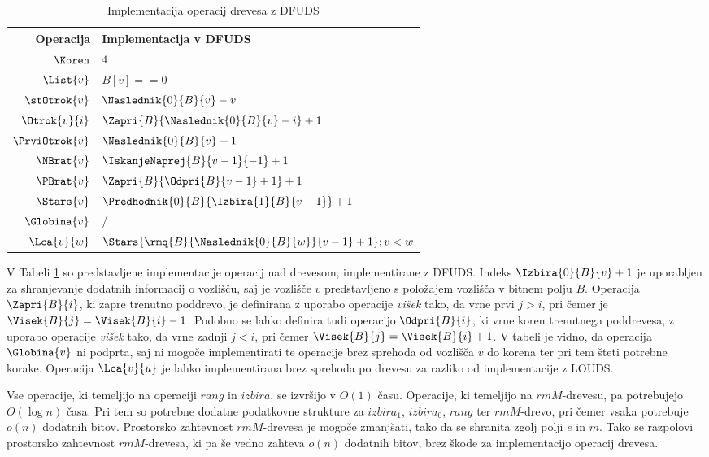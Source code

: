 \begin{table}[htb]
    \centering
    \caption{Implementacija operacij drevesa z DFUDS}
    \begin{tabular}{r|l}
\textbf{Operacija}& \textbf{Implementacija v DFUDS} \\\hline
         $\Koren$ &          $4$\\
         $\List{v}$ &        $B[v]==0$\\
         $\stOtrok{v}$&      $\Naslednik{0}{B}{v}-v$\\
         $\Otrok{v}{i}$ &    $\Zapri{B}{\Naslednik{0}{B}{v} - i}+1$\\
         $\PrviOtrok{v}$&     $\Naslednik{0}{B}{v}+1$\\
         $\NBrat{v}$ &       $\IskanjeNaprej{B}{v-1}{-1}+1$ \\
         $\PBrat{v}$ &       $\Zapri{B}{\Odpri{B}{v-1}+1}+1$ \\
         $\Stars{v}$ &        $\Predhodnik{0}{B}{\Izbira{1}{B}{v-1}}+1$ \\
         $\Globina{v}$ &         / \\
         $\Lca{v}{w}$ &      $\Stars{\rmq{B}{\Naslednik{0}{B}{w}}{v-1}+1};v<w$\\

    \end{tabular}
    \label{tab:DFUDSop}
\end{table}

V Tabeli \ref{tab:DFUDSop} so predstavljene implementacije operacij nad drevesom, implementirane z DFUDS. Indeks $\Izbira{0}{B}{v}+1$ je uporabljen za shranjevanje dodatnih informacij o vozlišču, saj je vozlišče $v$ predstavljeno s položajem vozlišča v bitnem polju $B$. Operacija $\Zapri{B}{i}$, ki zapre trenutno poddrevo, je definirana z uporabo operacije \textit{višek} tako, da vrne prvi $j>i$, pri čemer je $\Visek{B}{j}=\Visek{B}{i}-1$. Podobno se lahko definira tudi operacijo $\Odpri{B}{i}$, ki vrne koren trenutnega poddrevesa, z uporabo operacije \textit{višek} tako, da vrne zadnji $j<i$, pri čemer $\Visek{B}{j}=\Visek{B}{i}+1$. V tabeli je vidno, da operacija $\Globina{v}$ ni podprta, saj ni mogoče implementirati te operacije brez sprehoda od vozlišča $v$ do korena ter pri tem šteti potrebne korake. Operacija $\Lca{v}{u}$ je lahko implementirana brez sprehoda po drevesu za razliko od implementacije z LOUDS.

Vse operacije, ki temeljijo na operaciji $rang$ in $izbira$, se izvršijo v $O(1)$ času. Operacije, ki temeljijo na $rmM$-drevesu, pa potrebujejo $O(\log{n})$ časa. Pri tem so potrebne dodatne podatkovne strukture za $izbira_1$, $izbira_0$, $rang$ ter $rmM$-drevo, pri čemer vsaka potrebuje $o(n)$ dodatnih bitov. Prostorsko zahtevnost $rmM$-drevesa je mogoče zmanjšati, tako da se shranita zgolj polji $e$ in $m$. Tako se razpolovi prostorsko zahtevnost $rmM$-drevesa, ki pa še vedno zahteva $o(n)$ dodatnih bitov, brez škode za implementacijo operacij drevesa.

